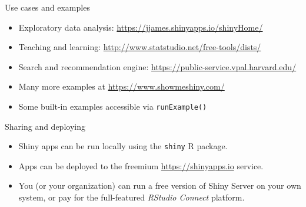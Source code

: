 \documentclass[
  12pt,
  ignorenonframetext,
]{beamer}
\providecommand{\tightlist}{%
  \setlength{\itemsep}{0pt}\setlength{\parskip}{0pt}}
\begin{document}
\begin{frame}[fragile]{Use cases and examples}
\protect\hypertarget{use-cases-and-examples}{}

\begin{itemize}
\item
  Exploratory data analysis:
  \url{https://jjames.shinyapps.io/shinyHome/}
\item
  Teaching and learning:
  \url{http://www.statstudio.net/free-tools/dists/}
\item
  Search and recommendation engine:
  \url{https://public-service.vpal.harvard.edu/}
\end{itemize}

\begin{itemize}[<+->]
\tightlist
\item
  Many more examples at \url{https://www.showmeshiny.com/}
\end{itemize}

\begin{itemize}[<+->]
\tightlist
\item
  Some built-in examples accessible via \texttt{runExample()}
\end{itemize}

\end{frame}

\begin{frame}[fragile]{Sharing and deploying}
\protect\hypertarget{sharing-and-deploying}{}

\begin{itemize}[<+->]
\tightlist
\item
  Shiny apps can be run locally using the \texttt{shiny} R package.

  \begin{center}
  \end{center}
\end{itemize}

\begin{itemize}[<+->]
\tightlist
\item
  Apps can be deployed to the freemium \url{https://shinyapps.io}
  service.

  \begin{center}
  \end{center}
\end{itemize}

\begin{itemize}[<+->]
\tightlist
\item
  You (or your organization) can run a free version of Shiny Server on
  your own system, or pay for the full-featured \emph{RStudio Connect}
  platform.
\end{itemize}

\end{frame}
\end{document}

